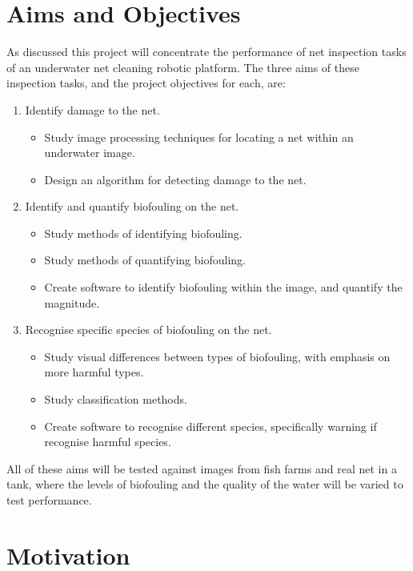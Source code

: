 \documentclass[11.5pt, twoside, a4paper]{article}
\begin{document}
\section{Aims and Objectives}
As discussed this project will concentrate the performance of net inspection tasks of an underwater net cleaning robotic platform. The three aims of these inspection tasks, and the project objectives for each, are:
\begin{enumerate}
\item Identify damage to the net.
\begin{itemize}
\item Study image processing techniques for locating a net within an underwater image.
\item Design an algorithm for detecting damage to the net.
\end{itemize}
\item Identify and quantify biofouling on the net.
\begin{itemize}
\item Study methods of identifying biofouling. %
\item Study methods of quantifying biofouling.
\item Create software to identify biofouling within the image, and quantify the magnitude.
\end{itemize}
\item Recognise specific species of biofouling on the net.
\begin{itemize}
\item Study visual differences between types of biofouling, with emphasis on more harmful types.
\item Study classification methods.
\item Create software to recognise different species, specifically warning if recognise harmful species.
\end{itemize}
\end{enumerate}
All of these aims will be tested against images from fish farms and real net in a tank, where the levels of biofouling and the quality of the water will be varied to test performance.


\section{Motivation}
\end{document}
